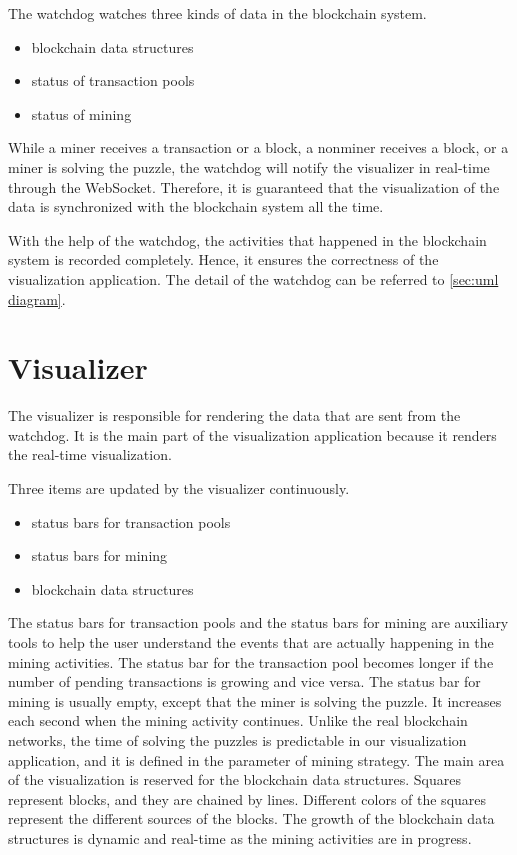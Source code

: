 The watchdog watches three kinds of data in the blockchain system.

\begin{itemize}
    \item blockchain data structures
    \item status of transaction pools
    \item status of mining
\end{itemize}

While a miner receives a transaction or a block, a nonminer receives a block, or a miner is solving the puzzle, the watchdog will notify the visualizer in real-time through the WebSocket. Therefore, it is guaranteed that the visualization of the data is synchronized with the blockchain system all the time.

With the help of the watchdog, the activities that happened in the blockchain system is recorded completely. Hence, it ensures the correctness of the visualization application. The detail of the watchdog can be referred to \ref{sec:uml diagram}.

\section{Visualizer}

The visualizer is responsible for rendering the data that are sent from the watchdog. It is the main part of the visualization application because it renders the real-time visualization. 

Three items are updated by the visualizer continuously.


\begin{itemize}
    \item status bars for transaction pools
    \item status bars for mining
    \item blockchain data structures
\end{itemize}

The status bars for transaction pools and the status bars for mining are auxiliary tools to help the user understand the events that are actually happening in the mining activities. The status bar for the transaction pool becomes longer if the number of pending transactions is growing and vice versa. The status bar for mining is usually empty, except that the miner is solving the puzzle. It increases each second when the mining activity continues. Unlike the real blockchain networks, the time of solving the puzzles is predictable in our visualization application, and it is defined in the parameter of mining strategy. The main area of the visualization is reserved for the blockchain data structures. Squares represent blocks, and they are chained by lines. Different colors of the squares represent the different sources of the blocks. The growth of the blockchain data structures is dynamic and real-time as the mining activities are in progress.

